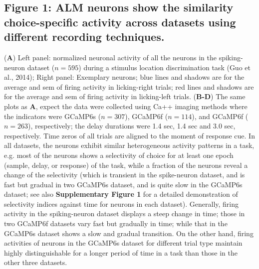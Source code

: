 \documentclass[12pt, oneside]{nature}
\begin{document}
\subsection{Figure 1: ALM neurons show the similarity choice-specific activity 
across datasets using different recording techniques.} 
(\textbf{A}) Left panel: normalized neuronal activity of all the neurons in
the spiking-neuron dataset ($n=595$) during a stimulus location discrimination 
task (Guo et al., 2014); Right panel: Exemplary neurons; blue lines
and shadows are for the average and sem of firing activity in licking-right trials; 
red lines and shadows are for the average and sem of firing activity 
in licking-left trials. (\textbf{B-D}) The same plots as \textbf{A}, expect the data 
were collected using Ca++ imaging methods where the indicators were GCaMP6s 
($n=307$), GCaMP6f ($n=114$), and GCaMP6f 
($n=263$), respectively; the delay durations were 1.4 sec, 1.4 sec and 3.0 sec, 
respectively. Time zeros of all trials are aligned to the moment of response cue. 
In all datasets, the neurons exhibit similar heterogeneous activity patterns in a task,
e.g. most of the neurons shows a selectivity of choice for at least one epoch
(sample, delay, or response) of the task, while a fraction of the neurons reveal
a change of the selectivity (which is transient in the spike-neuron dataset, and is
fast but gradual in two GCaMP6s dataset, and is quite slow in the GCaMP6s dataset;
see also \textbf{Supplementary Figure 1} for a detailed demonstration of selectivity
indices against time for neurons in each dataset).
Generally, firing activity in the spiking-neuron dataset displays a 
steep change in time; those in two GCaMP6f datasets vary fast but gradually in
time; while that in the GCaMP6s dataset shows a slow and gradual transition.
On the other hand, firing activities of neurons in the GCaMP6s dataset for 
different trial type maintain highly distinguishable for a longer period of time in a task 
than those in the other three datasets.
\end{document}
